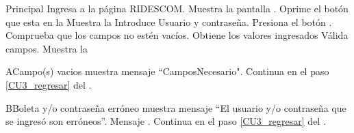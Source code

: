     \begin{UCtrayectoria}{Principal}
    \UCpaso[\UCactor] Ingresa a la página RIDESCOM.
    \UCpaso Muestra la pantalla .
    \UCpaso[\UCactor] Oprime el botón  que esta en la  
    \UCpaso Muestra la 
	\UCpaso[\UCactor] Introduce Usuario y contraseña. \label{CU3_regresar} 
    \UCpaso[\UCactor] Presiona el botón .
    \UCpaso Comprueba que los campos no estén vacíos. 
    \UCpaso Obtiene los valores ingresados
    \UCpaso Válida campos. 
    \UCpaso Muestra la 
    \end{UCtrayectoria}
    
    \begin{UCtrayectoriaA}{A}{Campo(s) vacios}
    	\UCpaso muestra mensaje “CamposNecesario".
    	\UCpaso Continua en el paso \ref{CU3_regresar} del .
    \end{UCtrayectoriaA}

	\begin{UCtrayectoriaA}{B}{Boleta y/o contraseña erróneo}
		\UCpaso muestra mensaje “El usuario y/o contraseña que se ingresó son erróneos”. Mensaje .
   		\UCpaso Continua en el paso \ref{CU3_regresar} del .
	\end{UCtrayectoriaA}

	


